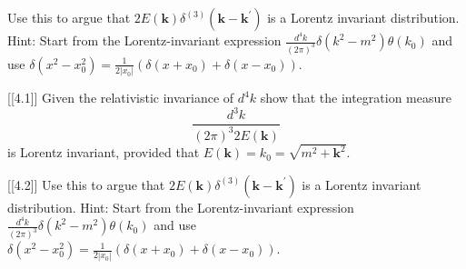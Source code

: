 Use this to argue that $2 E(\mathbf{k}) \delta^{(3)}\left(\mathbf{k}-\mathbf{k}^{\prime}\right)$ is a Lorentz invariant distribution.
Hint: Start from the Lorentz-invariant expression $\frac{d^4 k}{(2 \pi)^3} \delta\left(k^2-m^2\right) \theta\left(k_0\right)$ and use $\delta\left(x^2-x_0^2\right)=\frac{1}{2\left|x_0\right|}\left(\delta\left(x+x_0\right)+\delta\left(x-x_0\right)\right)$.

[[4.1]]
Given the relativistic invariance of $d^4 k$ show that the integration measure
$$
\frac{d^3 k}{(2 \pi)^3 2 E(\mathbf{k})}
$$
is Lorentz invariant, provided that $E(\mathbf{k})=k_0=\sqrt{m^2+\mathbf{k}^2}$. 

[[4.2]]
Use this to argue that $2 E(\mathbf{k}) \delta^{(3)}\left(\mathbf{k}-\mathbf{k}^{\prime}\right)$ is a Lorentz invariant distribution.
Hint: Start from the Lorentz-invariant expression $\frac{d^4 k}{(2 \pi)^3} \delta\left(k^2-m^2\right) \theta\left(k_0\right)$ and use $\delta\left(x^2-x_0^2\right)=\frac{1}{2\left|x_0\right|}\left(\delta\left(x+x_0\right)+\delta\left(x-x_0\right)\right)$.
